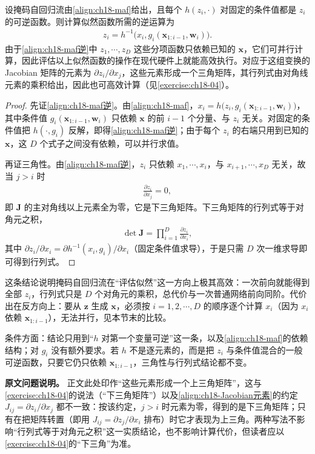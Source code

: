 \documentclass[../../main.tex]{subfiles}
\begin{document}
\begin{proposition}\label{proposition:ch18-maf逆}
设掩码自回归流由\eqref{align:ch18-maf}给出，且每个 $h(z_i,\cdot)$ 对固定的条件值都是 $z_i$ 的可逆函数。则计算似然函数所需的逆运算为
\begin{align}
  z_i=h^{-1}\big(x_i,g_i(\bm{x}_{1:i-1},\bm{w}_i)\big).\label{align:ch18-maf逆}
\end{align}
由于\eqref{align:ch18-maf逆}中 $z_1,\cdots,z_D$ 这些分项函数只依赖已知的 $\bm{x}$，它们可并行计算，因此评估以上似然函数的操作在现代硬件上就能高效执行。对应于这组变换的 Jacobian 矩阵的元素为 $\partial z_i/\partial x_j$，这些元素形成一个三角矩阵，其行列式由对角线元素的乘积给出，因此也可高效计算（见\cref{exercise:ch18-04}）。
\end{proposition}

\begin{proof}
先证\eqref{align:ch18-maf逆}。由\eqref{align:ch18-maf}，$x_i=h\big(z_i,g_i(\bm{x}_{1:i-1},\bm{w}_i)\big)$，其中条件值 $g_i(\bm{x}_{1:i-1},\bm{w}_i)$ 只依赖 $\bm{x}$ 的前 $i-1$ 个分量、与 $z_i$ 无关。对固定的条件值把 $h(\cdot,g_i)$ 反解，即得\eqref{align:ch18-maf逆}；由于每个 $z_i$ 的右端只用到已知的 $\bm{x}$，这 $D$ 个式子之间没有依赖，可以并行求值。

再证三角性。由\eqref{align:ch18-maf逆}，$z_i$ 只依赖 $x_1,\cdots,x_i$，与 $x_{i+1},\cdots,x_D$ 无关，故当 $j>i$ 时
\begin{align*}
  \frac{\partial z_i}{\partial x_j}=0,
\end{align*}
即 $\bm{J}$ 的主对角线以上元素全为零，它是下三角矩阵。下三角矩阵的行列式等于对角元之积，
\begin{align*}
  \det\bm{J}=\prod_{i=1}^{D}\frac{\partial z_i}{\partial x_i},
\end{align*}
其中 $\partial z_i/\partial x_i=\partial h^{-1}(x_i,g_i)/\partial x_i$（固定条件值求导），于是只需 $D$ 次一维求导即可得到行列式。
\end{proof}

\begin{remark}
这条结论说明掩码自回归流在“评估似然”这一方向上极其高效：一次前向就能得到全部 $z_i$，行列式只是 $D$ 个对角元的乘积，总代价与一次普通网络前向同阶。代价出在反方向上：要从 $\bm{z}$ 生成 $\bm{x}$，必须按 $i=1,2,\cdots,D$ 的顺序逐个计算 $x_i$（因为 $x_i$ 依赖 $\bm{x}_{1:i-1}$），无法并行，见本节末的比较。

条件方面：结论只用到“$h$ 对第一个变量可逆”这一条，以及\eqref{align:ch18-maf}的依赖结构；对 $g_i$ 没有额外要求。若 $h$ 不是逐元素的，而是把 $z_i$ 与条件值混合的一般可逆函数，只要它仍只依赖 $\bm{x}_{1:i-1}$，三角性与行列式结论都不变。

\textbf{原文问题说明。} 正文此处印作“这些元素形成一个上三角矩阵”，这与\cref{exercise:ch18-04}的说法（“下三角矩阵”）以及\eqref{align:ch18-Jacobian元素}的约定 $J_{ij}=\partial z_i/\partial x_j$ 都不一致：按该约定，$j>i$ 时元素为零，得到的是下三角矩阵；只有在把矩阵转置（即用 $J_{ij}=\partial z_j/\partial x_i$ 排布）时它才表现为上三角。两种写法不影响“行列式等于对角元之积”这一实质结论，也不影响计算代价，但读者应以\cref{exercise:ch18-04}的“下三角”为准。
\end{remark}
\end{document}
